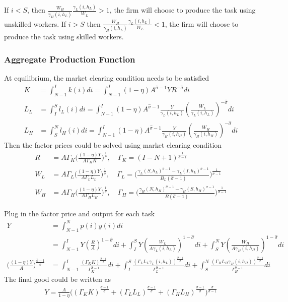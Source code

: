 \documentclass[12pt]{article}
\begin{document}
\begin{appendices}
If $i<S$, then $\frac{W_H}{\gamma_H(i,h_L)}\frac{\gamma_L(i,h_L)}{W_L}>1$, the firm will choose to produce the task using unskilled workers. If $i>S$ then $\frac{W_H}{\gamma_H(i,h_L)}\frac{\gamma_L(i,h_L)}{W_L}<1$, the firm will choose to produce the task using skilled workers.

\subsubsection*{Aggregate Production Function}
At equilibrium, the market clearing condition needs to be satisfied
\begin{align*}
K &= \int_{N-1}^I k(i)di=  \int_{N-1}^I(1-\eta)A^{\hat{\sigma}-1}YR^{-\hat{\sigma}}di \\
L_L &= \int_{I}^S l_L(i)di=  \int_{N-1}^I (1-\eta)A^{\hat{\sigma}-1}\frac{Y}{\gamma_L(i,h_L)}(\frac{W_L}{\gamma_L(i,h_L)})^{-\hat{\sigma}}di \\
L_H &=\int_{S}^N l_H(i)di=  \int_{N-1}^I (1-\eta)A^{\hat{\sigma}-1}\frac{Y}{\gamma_H(i,h_H)}(\frac{W_H}{\gamma_H(i,h_H)})^{-\hat{\sigma}} di
\end{align*}
Then the factor prices could be solved using market clearing condition 
\begin{align*}
R &=A\Gamma_K \Big(\frac{(1-\eta)Y}{A\Gamma_K K}\Big)^{\frac{1}{\hat{\sigma}}}, \quad \Gamma_K= (I-N+1)^{\frac{1}{\hat{\sigma}-1}}  \\
W_L &= A\Gamma_L\Big(\frac{(1-\eta)Y}{A\Gamma_LL_L}\Big)^{\frac{1}{\hat{\sigma}}}, \quad \Gamma_L=\Big(\frac{\gamma_L(S,h_L)^{\hat{\sigma}-1}-\gamma_L(I,h_L)^{\hat{\sigma}-1}}{B_L(\hat{\sigma}-1)}\Big)^{\frac{1}{\hat{\sigma}-1}}  \\
W_H &=A\Gamma_H\Big(\frac{(1-\eta)Y}{A\Gamma_HL_H}\Big)^{\frac{1}{\hat{\sigma}}}, \quad \Gamma_H = \Big(\frac{\gamma_H(N,h_H)^{\hat{\sigma}-1}-\gamma_H(S,h_H)^{\hat{\sigma}-1}}{B(\hat{\sigma}-1)}\Big)^{\frac{1}{\hat{\sigma}-1}} 
\end{align*}

Plug in the factor price and output for each task 
\begin{align*}
Y &= \int_{N-1}^N p(i)y(i) di \\
	&= \int_{N-1}^I Y(\frac{R}{A})^{1-\hat{\sigma}} di + \int_I^S Y(\frac{W_L}{A\gamma_L(i,h_L)})^{1-\hat{\sigma}} di  + \int_S^N Y(\frac{W_H}{A\gamma_H(i,h_H)})^{1-\hat{\sigma}} di \\
\Big(\frac{(1-\eta)Y}{A} \Big)^{\frac{\hat{\sigma}-1}{\hat{\sigma}}} &= \int_{N-1}^I \frac{(\Gamma_K K)^{\frac{\hat{\sigma}-1}{\hat{\sigma}}}}{\Gamma_K^{\hat{\sigma}-1}} di + \int_I^S \frac{(\Gamma_LL_L \gamma_L(i,h_L))^{\frac{\hat{\sigma}-1}{\hat{\sigma}}}}{\Gamma_L^{\hat{\sigma}-1}} di  + \int_S^N \frac{(\Gamma_HL_H \gamma_H(i,h_H))^{\frac{\hat{\sigma}-1}{\hat{\sigma}}}}{\Gamma_H^{\hat{\sigma}-1}} di 
 \end{align*}
The final good could be written as 
\begin{align*}
Y = \frac{A}{1-\eta}\Big((\Gamma_K K)^{\frac{\hat{\sigma}-1}{\hat{\sigma}}}+(\Gamma_LL_L)^{\frac{\hat{\sigma}-1}{\hat{\sigma}}}+(\Gamma_HL_H)^{\frac{\hat{\sigma}-1}{\hat{\sigma}}}\Big)^{\frac{\hat{\sigma}}{\hat{\sigma}-1}}
 \end{align*}


\end{appendices}
\end{document}
